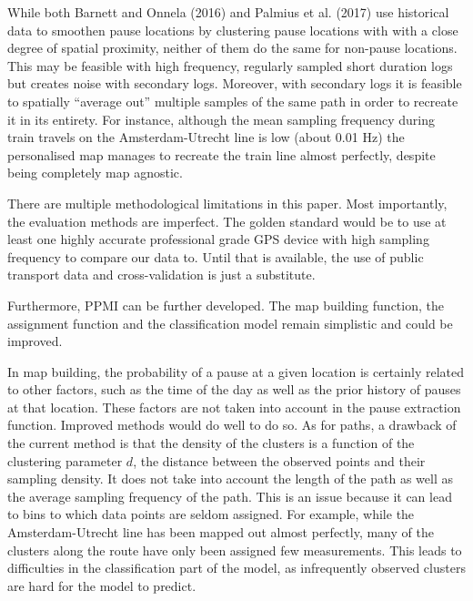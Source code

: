 \documentclass[man]{apa6}
\theoremstyle{definition}
\theoremstyle{definition}
\theoremstyle{definition}
\theoremstyle{remark}
\begin{document}
While both Barnett and Onnela (2016) and Palmius et al. (2017) use
historical data to smoothen pause locations by clustering pause
locations with with a close degree of spatial proximity, neither of them
do the same for non-pause locations. This may be feasible with high
frequency, regularly sampled short duration logs but creates noise with
secondary logs. Moreover, with secondary logs it is feasible to
spatially \enquote{average out} multiple samples of the same path in
order to recreate it in its entirety. For instance, although the mean
sampling frequency during train travels on the Amsterdam-Utrecht line is
low (about 0.01 Hz) the personalised map manages to recreate the train
line almost perfectly, despite being completely map agnostic.

There are multiple methodological limitations in this paper. Most
importantly, the evaluation methods are imperfect. The golden standard
would be to use at least one highly accurate professional grade GPS
device with high sampling frequency to compare our data to. Until that
is available, the use of public transport data and cross-validation is
just a substitute.

Furthermore, PPMI can be further developed. The map building function,
the assignment function and the classification model remain simplistic
and could be improved.

In map building, the probability of a pause at a given location is
certainly related to other factors, such as the time of the day as well
as the prior history of pauses at that location. These factors are not
taken into account in the pause extraction function. Improved methods
would do well to do so. As for paths, a drawback of the current method
is that the density of the clusters is a function of the clustering
parameter \(d\), the distance between the observed points and their
sampling density. It does not take into account the length of the path
as well as the average sampling frequency of the path. This is an issue
because it can lead to bins to which data points are seldom assigned.
For example, while the Amsterdam-Utrecht line has been mapped out almost
perfectly, many of the clusters along the route have only been assigned
few measurements. This leads to difficulties in the classification part
of the model, as infrequently observed clusters are hard for the model
to predict.
\end{document}
